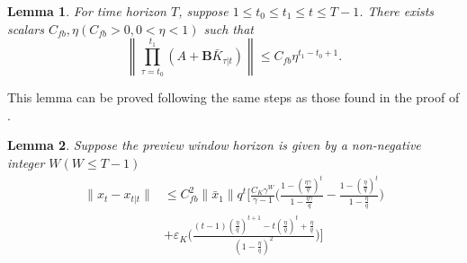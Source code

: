\documentclass[letterpaper, 10 pt, conference]{ieeeconf}  %
\newtheorem{lemma}{Lemma}
\begin{document}
\begin{lemma}\label{lemma:multGain}
    For time horizon $T$, suppose $1\leq t_{0} \leq t_{1}\leq t\leq T-1$. There exists scalars $C_{fb},\eta(C_{fb}>0,0<\eta<1)$ such that
    \begin{equation}
        \left \| \prod_{\tau=t_{0}}^{t_{1}}(A+\mathbf{B}\bar{K}_{\tau|t})  \right\| \leq C_{fb}\eta^{t_{1}-t_{0}+1}.
    \end{equation}
\end{lemma}
This lemma can be proved following the same steps as those found in the proof of \cite[Appendix E,Proposition 2]{zhang_regret_2021}.
\begin{lemma}
    Suppose the preview window horizon is given by a non-negative integer $W(W \leq T-1)$
    \begin{equation}
    \begin{split}
        \|x_{t}-x_{t|t}\| &\leq C_{fb}^{2}\|\bar{x}_{1}\|q^{t}[\frac{C_{K}\gamma^{W}}{\gamma-1}\bigg(\frac{1-(\frac{\eta\gamma}{q})^{t}}{1-\frac{\eta\gamma}{q}} - \frac{1-(\frac{\eta}{q})^{t}}{1-\frac{\eta}{q}} \bigg)\\
        &+\varepsilon_{K}\bigg(\frac{(t-1)(\frac{\eta}{q})^{t+1}-t(\frac{\eta}{q})^{t}+\frac{\eta}{q}}{(1-\frac{\eta}{q})^{2}}\bigg)]
    \end{split}
    \end{equation}
\end{lemma}
\end{document}
